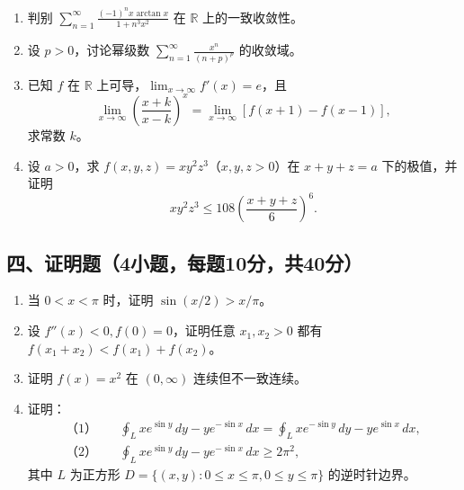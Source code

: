 \documentclass[11pt,fontset=fandol]{ctexart}
\begin{document}
\begin{enumerate}
\def\labelenumi{\arabic{enumi}.}
\item
  判别
  \(\displaystyle\sum_{n=1}^\infty\frac{(-1)^nx\arctan x}{1+n^3x^2}\) 在
  \(\mathbb R\) 上的一致收敛性。
\item
  设 \(p>0\)，讨论幂级数
  \(\displaystyle\sum_{n=1}^\infty\frac{x^n}{(n+p)^p}\) 的收敛域。
\item
  已知 \(f\) 在 \(\mathbb R\) 上可导，\(\lim_{x\to\infty}f'(x)=e\)，且
  \[
  \lim_{x\to\infty}\left(\frac{x+k}{x-k}\right)^x
  =\lim_{x\to\infty}[f(x+1)-f(x-1)],
  \] 求常数 \(k\)。
\item
  设 \(a>0\)，求 \(f(x,y,z)=xy^2z^3\)（\(x,y,z>0\)）在 \(x+y+z=a\)
  下的极值，并证明 \[
  xy^2z^3\le108\left(\frac{x+y+z}{6}\right)^6.
  \]
\end{enumerate}

\subsection{四、证明题（4小题，每题10分，共40分）}\label{ux56dbux8bc1ux660eux98984ux5c0fux9898ux6bcfux989810ux5206ux517140ux5206}

\begin{enumerate}
\def\labelenumi{\arabic{enumi}.}
\item
  当 \(0<x<\pi\) 时，证明 \(\sin(x/2)>x/\pi\)。
\item
  设 \(f''(x)<0,f(0)=0\)，证明任意 \(x_1,x_2>0\) 都有
  \(f(x_1+x_2)<f(x_1)+f(x_2)\)。
\item
  证明 \(f(x)=x^2\) 在 \((0,\infty)\) 连续但不一致连续。
\item
  证明： \[
  \begin{aligned}
  \text{（1）}\quad&\oint_Lxe^{\sin y}\,dy-ye^{-\sin x}\,dx
  =\oint_Lxe^{-\sin y}\,dy-ye^{\sin x}\,dx,\\
  \text{（2）}\quad&\oint_Lxe^{\sin y}\,dy-ye^{-\sin x}\,dx\ge2\pi^2,
  \end{aligned}
  \] 其中 \(L\) 为正方形 \(D=\{(x,y):0\le x\le\pi,0\le y\le\pi\}\)
  的逆时针边界。
\end{enumerate}
\end{document}
